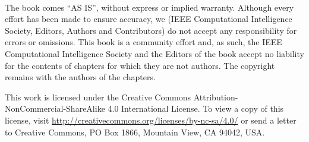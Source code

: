 \thispagestyle{empty}
\ 
\vspace{7cm}

The book comes “AS IS”, without express or implied warranty. Although every effort has been made to ensure accuracy, we (IEEE Computational Intelligence Society, Editors, Authors and Contributors) do not accept any responsibility for errors or omissions.
This book is a community effort and, as such, the IEEE Computational Intelligence Society and the Editors of the book accept no liability for the contents of chapters for which they are not authors. The copyright remains with the authors of the chapters.

This work is licensed under the Creative Commons Attribution-\\NonCommercial-ShareAlike 4.0 International License. To view a copy of this license, visit \url{http://creativecommons.org/licenses/by-nc-sa/4.0/} or send a letter to Creative Commons, PO Box 1866, Mountain View, CA 94042, USA.

